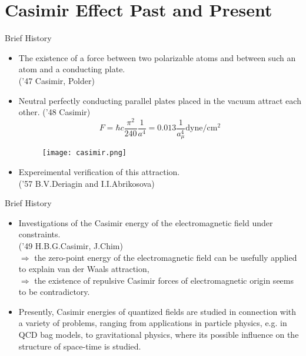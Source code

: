 \documentclass{beamer}
\begin{document}
\section{Casimir Effect Past and Present}
\begin{frame}{Brief History}
\begin{itemize}
    \item The existence of a force between two polarizable atoms and between such an atom and a conducting plate.\\ {\color{blue}('47 Casimir, Polder)}
    \item  Neutral perfectly conducting parallel plates placed in the vacuum attract each other. {\color{blue}('48 Casimir)}
    \begin{equation*}
        F=\hbar c\frac{\pi^2}{240}\frac{1}{a^4}=0.013\frac{1}{a_\mu^4}\mathrm{dyne/cm^2}
    \end{equation*}
    \begin{figure}[H]
        \centering
        \texttt{[image: casimir.png]}
        \label{fig:my_label}
    \end{figure}
    \item Expereimental verification of this attraction.\\{\color{blue}('57 B.V.Deriagin and I.I.Abrikosova)}
    \end{itemize}
\end{frame}
\begin{frame}{Brief History}
\begin{itemize}
    \item Investigations of the Casimir energy of the electromagnetic field under constraints.\\{\color{blue}('49 H.B.G.Casimir, J.Chim)}\\ 
     $\Rightarrow$ the zero-point energy of the electromagnetic field can be usefully applied to explain van der Waals attraction,\\
     $\Rightarrow$ the existence of repulsive Casimir forces of electromagnetic origin seems to be contradictory.
    
    \item Presently, Casimir energies of quantized fields are studied in connection with a variety of problems, ranging from applications in particle physics, e.g. in QCD bag models, to gravitational physics, where its possible influence on the structure of space-time is studied.
\end{itemize}
\end{frame}
\end{document}
